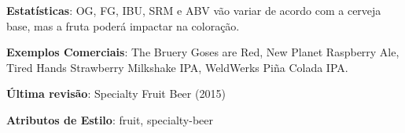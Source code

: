 \textbf{Estatísticas}: OG, FG, IBU, SRM e ABV vão variar de acordo com a cerveja base, mas a fruta poderá impactar na coloração.

\textbf{Exemplos Comerciais}: The Bruery Goses are Red, New Planet Raspberry Ale, Tired Hands Strawberry Milkshake IPA, WeldWerks Piña Colada IPA.

\textbf{Última revisão}: Specialty Fruit Beer (2015)

\textbf{Atributos de Estilo}: fruit, specialty-beer
